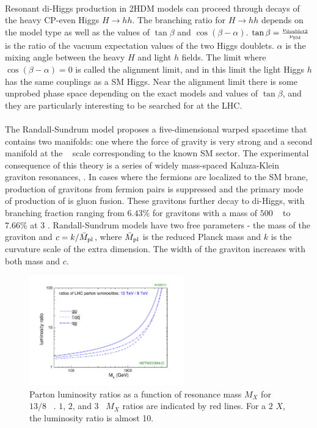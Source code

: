 \paragraph{}
Resonant di-Higgs production in 2HDM models can proceed through decays of the heavy CP-even Higgs $H\to hh$. 
The branching ratio for $H\to hh$ depends on the model type as well as the values of $\tan{\beta}$ and $\cos(\beta - \alpha)$. 
$\tan{\beta} = \frac{\rm \nu_{\rm doublet2}}{\rm \nu_{SM}}$ is the ratio of the vacuum expectation values of the two Higgs doublets. 
$\alpha$ is the mixing angle between the heavy $H$ and light $h$ fields. 
The limit where $\cos(\beta - \alpha) = 0$ is called the alignment limit, and in this limit the light Higgs $h$ has the same couplings as a SM Higgs. 
Near the alignment limit there is some unprobed phase space depending on the exact models and values of $\tan{\beta}$, and they are particularly interesting to be searched for at the LHC.

\paragraph{}
The Randall-Sundrum model proposes a five-dimensional warped spacetime that contains two manifolds: one where the force of gravity is very strong and a second manifold at the \TeV~ scale corresponding to the known SM sector.
The experimental consequence of this theory is a series of widely mass-spaced Kaluza-Klein graviton resonances, \Grav. 
In cases where the fermions are localized to the SM brane, production of gravitons from fermion pairs is suppressed and the primary mode of production of \Grav is gluon fusion. 
These gravitons further decay to di-Higgs, with branching fraction ranging from $6.43$\% for gravitons with a mass of $500$ \GeV~ to $7.66\%$ at $3$ \TeV.
Randall-Sundrum models have two free parameters - the mass of the graviton and $c = k/\bar{M}_{\rm pl}$, where $\bar{M}_{\rm pl}$ is the reduced Planck mass and $k$ is the curvature scale of the extra dimension. 
The width of the graviton increases with both mass and $c$.

\begin{figure}[htbp!]
  \centering
  \captionsetup{justification=centering}
  \includegraphics[width=0.6\textwidth]{figures/theory/lhclumi7813_2013_v1}
  \caption{Parton luminosity ratios as a function of resonance mass $M_{X}$ for $13/8$ \TeV~\cite{LumiRatio}. $1$, $2$, and $3$ ~\TeV $M_{X}$ ratios are indicated by red lines. For a $2$ \TeV $X$, the luminosity ratio is almost 10.}
  \label{fig:lumi_ratio}
\end{figure}

